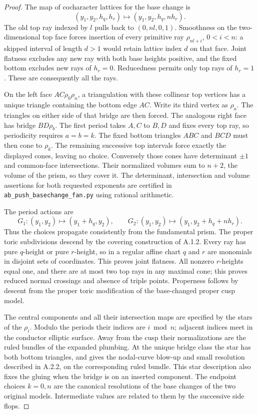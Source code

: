 \begin{proof}
The map of cocharacter lattices for the base change is
\[
 (y_1,y_2,h_q,h_r)\longmapsto
 (y_1,y_2,h_q,nh_r).
\]
The old top ray indexed by $l$ pulls back to
$(0,nl,0,1)$. Smoothness on the two-dimensional top
face forces insertion of every primitive ray
$\rho_{nl+i}$, $0<i<n$: a skipped interval of length
$d>1$ would retain lattice index $d$ on that face.
Joint flatness excludes any new ray with both base
heights positive, and the fixed bottom excludes new
rays of $h_r=0$. Reducedness permits only top rays
of $h_r=1$. These are consequently all the rays.

On the left face $AC\rho_0\rho_n$, a triangulation
with these collinear top vertices has a unique triangle
containing the bottom edge $AC$. Write its third
vertex as $\rho_a$. The triangles on either side
of that bridge are then forced. The analogous right
face has bridge $BD\rho_b$. The first period takes
$A,C$ to $B,D$ and fixes every top ray, so periodicity
requires $a=b=k$. The fixed bottom triangles $ABC$
and $BCD$ must then cone to $\rho_k$. The remaining
successive top intervals force exactly the displayed
cones, leaving no choice. Conversely those cones
have determinant $\pm1$ and common-face
intersections. Their normalized volumes sum to
$n+2$, the volume of the prism, so they cover it.
The determinant, intersection and volume assertions
for both requested exponents are certified in
\texttt{ab\_push\_basechange\_fan.py} using rational
arithmetic.

The period actions are
\[
 G_1:(y_1,y_2)\mapsto(y_1+h_q,y_2),\qquad
 G_2:(y_1,y_2)\mapsto(y_1,y_2+h_q+nh_r).
\]
Thus the choices propagate consistently from the
fundamental prism. The proper toric subdivisions
descend by the covering construction of A.1.2.
Every ray has pure $q$-height or pure $r$-height, so
in a regular affine chart $q$ and $r$ are monomials
in disjoint sets of coordinates. This proves joint
flatness. All nonzero $r$-heights equal one, and
there are at most two top rays in any maximal cone;
this proves reduced normal crossings and absence of
triple points. Properness follows by descent from
the proper toric modification of the base-changed
proper cusp model.

The central components and all their intersection
maps are specified by the stars of the $\rho_i$.
Modulo the periods their indices are $i\bmod n$;
adjacent indices meet in the conductor elliptic
surface. Away from the cusp their normalizations
are the ruled bundles of the expanded plumbing.
At the unique bridge class the star has both bottom
triangles, and gives the nodal-curve blow-up and
small resolution described in A.2.2, on the
corresponding ruled bundle. This star description
also fixes the gluing when the bridge is on an
inserted component. The endpoint choices $k=0,n$
are the canonical resolutions of the base changes
of the two original models. Intermediate values
are related to them by the successive side flops.


\end{proof}
